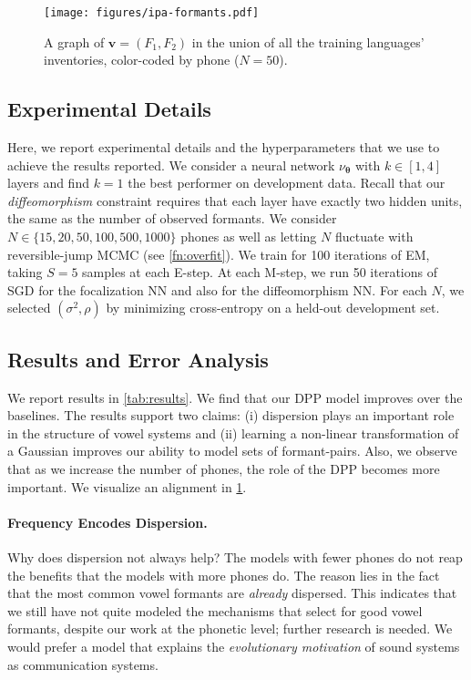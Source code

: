 \documentclass[11pt,a4paper]{article}
\newcommand{\vtheta}{{\boldsymbol \theta}}
\newcommand{\vv}{{\mathbf{v}}}
\newcommand{\NN}{\nu_{\vtheta}}
\begin{document}
\begin{figure}
  \begin{adjustbox}{width=\columnwidth}
    \texttt{[image: figures/ipa-formants.pdf]}
  \end{adjustbox}
  \caption{A graph of $\vv = (F_1, F_2)$ in the union of all the training languages' inventories, color-coded by phone ($N = 50$).
   }
  \label{fig:graph}
\end{figure}

\subsection{Experimental Details}
Here, we report experimental details and the hyperparameters
that we use to achieve the results reported. We consider
a neural network $\NN$ with $k \in [1, 4]$ layers  and find $k=1$
the best performer on development data. Recall
that our \emph{diffeomorphism} constraint requires that each layer
have exactly two hidden units, the same as the number of observed formants. We consider $N \in \{15, 20, 50, 100,
500, 1000\}$ phones as well as letting $N$ fluctuate with
reversible-jump MCMC (see \cref{fn:overfit}).
We train for 100 iterations of EM, taking $S=5$ samples at each
E-step.
At each M-step, we run 50 iterations of SGD for the focalization NN
and also for the diffeomorphism NN.
For each $N$, we selected $(\sigma^2,\rho)$ by minimizing
cross-entropy on a held-out development set. 

\subsection{Results and Error Analysis}
We report results in \cref{tab:results}. We find that our DPP
model improves over the baselines. The results support two claims: (i) dispersion
plays an important role in the structure of vowel systems and (ii) learning a non-linear transformation of a Gaussian improves our ability to model sets of formant-pairs. Also, we observe that as we increase the number of phones, the role
of the DPP becomes more important.
We visualize an alignment in \cref{fig:graph}.

\paragraph{Frequency Encodes Dispersion.}
Why does dispersion not always help? The models
with fewer phones do not reap the benefits
that the models with more phones do. The reason lies
in the fact that the most common vowel formants are \emph{already} dispersed. This indicates that we
still have not quite modeled the mechanisms that select
for good vowel formants, despite our work at the phonetic level;
further research is needed. We would prefer a model
that explains the \emph{evolutionary motivation} of sound systems
as communication systems.
\end{document}
